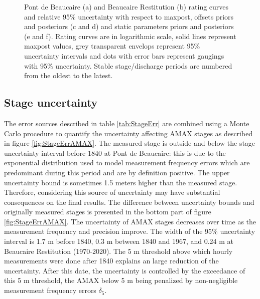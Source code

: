\documentclass[11pt]{article}
\begin{document}
\begin{figure}[h!]
\begin{subfigure}{0.1\textwidth}
        \end{subfigure}
        \caption{Pont de Beaucaire (a) and Beaucaire Restitution (b) rating curves and relative 95\% uncertainty with respect to maxpost, offsets priors and posteriors (c and d) and static parameters priors and posteriors (e and f). Rating curves are in logarithmic scale, solid lines represent maxpost values, grey transparent envelops represent 95\% uncertainty intervals and dots with error bars represent gaugings with 95\% uncertainty. Stable stage/discharge periods are numbered from the oldest to the latest.}
        \label{fig:RcsAndParams}
    \end{figure}
    
    \subsection{Stage uncertainty}
    \label{subsec:StageErrResults}
    
    The error sources described in table \ref{tab:StageErr} are combined using a Monte Carlo procedure to quantify the uncertainty affecting AMAX stages as described in figure \ref{fig:StageErrAMAX}. The measured stage is outside and below the stage uncertainty interval before 1840 at Pont de Beaucaire: this is due to the exponential distribution used to model measurement frequency errors which are predominant during this period and are by definition positive. The upper uncertainty bound is sometimes 1.5 meters higher than the measured stage. Therefore, considering this source of uncertainty may have substantial consequences on the final results. The difference between uncertainty bounds and originally measured stages is presented in the bottom part of figure \ref{fig:StageErrAMAX}. The uncertainty of AMAX stages decreases over time as the measurement frequency and precision improve. The width of the 95\% uncertainty interval is 1.7 m before 1840, 0.3 m between 1840 and 1967, and 0.24 m at Beaucaire Restitution (1970-2020). The 5 m threshold above which hourly measurements were done after 1840 explains an large reduction of the uncertainty. After this date, the uncertainty is controlled by the exceedance of this 5 m threshold, the AMAX below 5 m being penalized by non-negligible measurement frequency errors $\delta_5$. 
    
\end{document}
